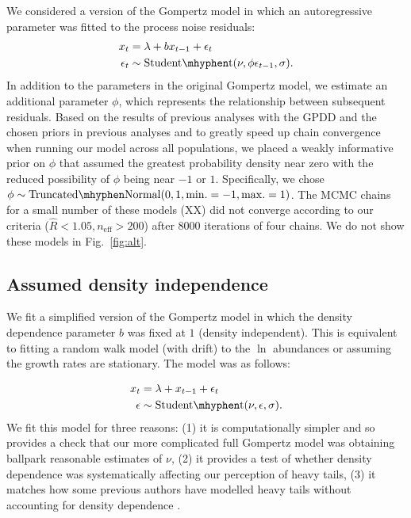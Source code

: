 We considered a version of the Gompertz model in which an autoregressive parameter was fitted to the process noise residuals: 
\begin{align*}
x_t &= \lambda + b x_{t-1} + \epsilon_t\\
\epsilon_t &\sim \mathrm{Student\mhyphen t}(\nu, \phi \epsilon_{t-1}, \sigma).
\end{align*}
In addition to the parameters in the original Gompertz model, we estimate an additional parameter $\phi$, which represents the relationship between subsequent residuals. Based on the results of previous analyses with the GPDD \citep[e.g.][]{connors2014} and the chosen priors in previous analyses \citep[e.g.][]{thorson2014a} and to greatly speed up chain convergence when running our model across all populations, we placed a weakly informative prior on $\phi$ that assumed the greatest probability density near zero with the reduced possibility of $\phi$ being near $-1$ or $1$. Specifically, we chose $\phi \sim \mathrm{Truncated\mhyphen Normal}(0, 1, \mathrm{min.} = -1, \mathrm{max.} = 1)$. The MCMC chains for a small number of these models (XX) did not converge according to our criteria ($\widehat{R} < 1.05, n_\mathrm{eff} > 200$) after 8000 iterations of four chains. We do not show these models in Fig.~\ref{fig:alt}.

\subsection{Assumed density independence}\label{assumed-density-independence}

We fit a simplified version of the Gompertz model in which the density dependence parameter $b$ was fixed at $1$ (density independent). This is equivalent to fitting a random walk model (with drift) to the $\ln$ abundances or assuming the growth rates are stationary. The model was as follows: 

\begin{align*}
x_t &= \lambda + x_{t-1} + \epsilon_t\\
\epsilon &\sim \mathrm{Student\mhyphen t}(\nu, \epsilon, \sigma).
\end{align*}
We fit this model for three reasons: (1) it is computationally simpler and so provides a check that our more complicated full Gompertz model was obtaining ballpark reasonable estimates of $\nu$, (2) it provides a test of whether density dependence was systematically affecting our perception of heavy tails, (3) it matches how some previous authors have modelled heavy tails without accounting for density dependence \citep{segura2013}.

